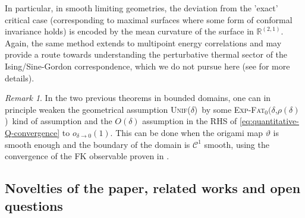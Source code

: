 \documentclass[reqno]{amsart}
\numberwithin{equation}{section}
\theoremstyle{definition}
\theoremstyle{remark}
\newtheorem{remark}[theo]{Remark}
\def\ExpFat{{{\mbox{\textsc{Exp-Fat}$_0(\delta$\textsc{,}$\rho(\delta)$\textsc{)}}}}}
\newcommand\Unif{{\mbox{\textsc{Unif(}$\delta$\textsc{)}}}}
\begin{document}
In particular, in smooth limiting geometries, the deviation from the 'exact' critical case (corresponding to maximal surfaces where some form of conformal invariance holds) is encoded by
the mean curvature of the surface in $\mathbb{R}^{(2,1)} $. Again, the same method extends to multipoint energy correlations and may provide a route towards understanding the perturbative thermal sector of the Ising/Sine-Gordon correspondence, which we do not pursue here (see \cite{park2025near,berestycki2026massive} for more details).

\begin{remark}\label{rem:regularity-discrete}
In the two previous theorems in bounded domains, one can in principle weaken the geometrical assumption \Unif\, by some \ExpFat\, kind of assumption and the $O(\delta)$ assumption in the RHS of \eqref{eq:quantitative-Q-convergence} to $o_{\delta \to 0}(1)$. This can be done when the origami map $\vartheta$ is smooth enough and the boundary of the domain is $\mathcal{C}^1$ smooth, using the convergence of the FK observable proven in \cite[Chapter 6]{MahPHD}.
\end{remark}

\subsection{Novelties of the paper, related works and open questions}\label{sub:novelties}
\end{document}
